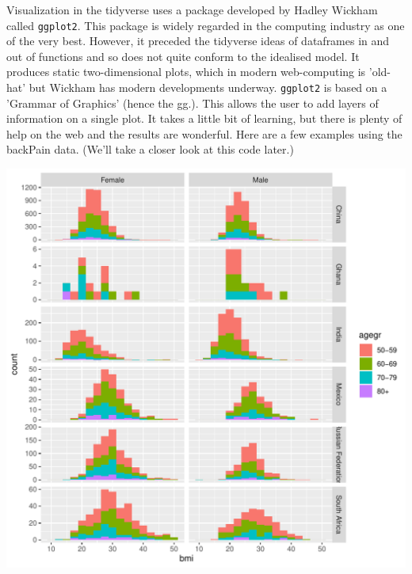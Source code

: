\documentclass[titlepage]{book}\usepackage{knitr}
\begin{document}
Visualization in the tidyverse uses a package developed by Hadley Wickham called \texttt{ggplot2}. This package is widely regarded in the computing industry as one of the very best.  However, it preceded the tidyverse ideas of dataframes in and out of functions and so does not quite conform to the idealised model. It produces static two-dimensional plots, which in modern web-computing is 'old-hat' but Wickham has modern developments underway. 
\texttt{ggplot2} is based on a 'Grammar of Graphics' (hence the gg.). This allows the user to add layers of information on a single plot.  It takes a little bit of learning, but there is plenty of help on the web and the results are wonderful.
Here are a few examples using the backPain data. (We'll take a closer look at this code later.)


\begin{knitrout}
\color{fgcolor}\begin{kframe}
\begin{alltt}
 \hlkwb{<-}  \hlstd{(}  \hlopt{+}
  \hlstd{(} \hlstd{=} \hlstd{)} \hlopt{+}
   \hlopt{~} \hlstd{=}\hlstd{)}
\end{alltt}
\end{kframe}
\includegraphics[width=\maxwidth]{figure/L1_FacetedHistograms-1} 

\end{knitrout}
\end{document}
